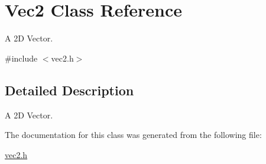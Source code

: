 \hypertarget{class_vec2}{}\section{Vec2 Class Reference}
\label{class_vec2}


A 2\+D Vector.  




{\ttfamily \#include $<$vec2.\+h$>$}



\subsection{Detailed Description}
A 2\+D Vector. 

The documentation for this class was generated from the following file\+:\begin{DoxyCompactItemize}
\item 
\hyperlink{vec2_8h}{vec2.\+h}\end{DoxyCompactItemize}

